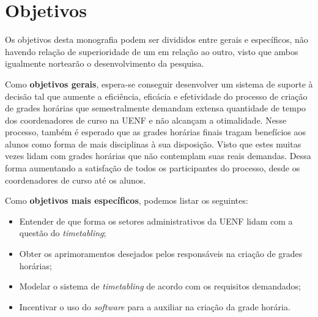 \section{Objetivos} \label{sec:Objetivos}                %

Os objetivos desta monografia podem ser divididos entre gerais e específicos, não havendo relação de superioridade de um em relação ao outro, visto que ambos igualmente nortearão o desenvolvimento da pesquisa.


Como \textbf{objetivos gerais}, espera-se conseguir desenvolver um sistema de suporte à decisão tal que aumente a eficiência, eficácia e efetividade do processo de criação de grades horárias que semestralmente demandam extensa quantidade de tempo dos coordenadores de curso na UENF e não alcançam a otimalidade. Nesse processo, também é esperado que as grades horárias finais tragam benefícios aos alunos como forma de mais disciplinas à sua disposição. Visto que estes muitas vezes lidam com grades horárias que não contemplam suas reais demandas. Dessa forma aumentando a satisfação de todos os participantes do processo, desde os coordenadores de curso até os alunos.


Como \textbf{objetivos mais específicos}, podemos listar os seguintes:

\begin{itemize}
      \item Entender de que forma os setores administrativos da UENF lidam com a questão do \textit{timetabling};
      \item Obter os aprimoramentos desejados pelos responsáveis na criação de grades horárias;
      \item Modelar o sistema de \textit{timetabling} de acordo com os requisitos demandados;
      \item Incentivar o uso do \textit{software} para a auxiliar na criação da grade horária.
\end{itemize}


